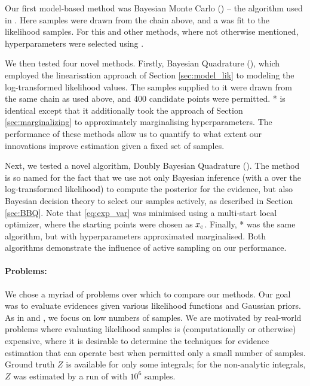 \documentclass{article}
\begin{document}

Our first model-based method was Bayesian Monte Carlo () -- the algorithm used in \citep{BZMonteCarlo}. Here samples were drawn from the  chain above, and a \gpb was fit to the likelihood samples. For this and other methods, where not otherwise mentioned, \gpb hyperparameters were selected using . 

We then tested four novel methods. Firstly, Bayesian Quadrature (), which employed the linearisation approach of Section \ref{sec:model_lik} to modeling the log-transformed likelihood values. The samples supplied to it were drawn from the same  chain as used above, and 400 candidate points were permitted. * is identical except that it additionally took the approach of Section \ref{sec:marginalizing} to approximately marginalising hyperparameters. The performance of these methods allow us to quantify to what extent our innovations improve estimation given a fixed set of samples. 

Next, we tested a novel algorithm, Doubly Bayesian Quadrature (). The method is so named for the fact that we use not only Bayesian inference (with a \gpb over the log-transformed likelihood) to compute the posterior for the evidence, but also Bayesian decision theory to select our samples actively, as described in Section \ref{sec:BBQ}. Note that \eqref{eq:exp_var} was minimised using a multi-start local optimizer, where the starting points were chosen as $\lfv_c$. Finally, * was the same algorithm, but with hyperparameters  approximated marginalised. Both algorithms demonstrate the influence of active sampling on our performance. 

\paragraph{Problems:}
We chose a myriad of problems over which to compare our methods. Our goal was to evaluate evidences given various likelihood functions and Gaussian priors. As in \citet{BZMonteCarlo} and \citet{BQR}, we focus on low numbers of samples. We are motivated by real-world problems where evaluating likelihood samples is (computationally or otherwise) expensive, where it is desirable to determine the techniques for evidence estimation that can operate best when permitted only a small number of samples. Ground truth $Z$ is available for only some integrals; for the non-analytic integrals, $Z$ was estimated by a run of  with $10^6$ samples.
\end{document}
